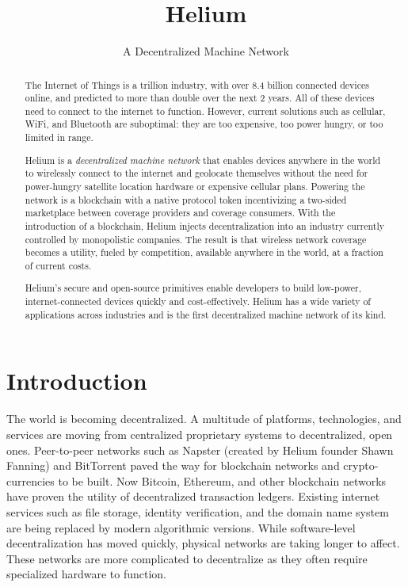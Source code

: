 \documentclass[10pt, nonatbib, nocopyrightspace, reprint]{sigplanconf}
\begin{document}
\setlength{\pdfpageheight}{\paperheight}
\setlength{\pdfpagewidth}{\paperwidth}

\title{Helium}
\subtitle{A Decentralized Machine Network}

\maketitle

\begin{abstract}
The Internet of Things is a  trillion industry, with over 8.4 billion connected devices online, and predicted to more than double over the next 2 years. All of these devices need to connect to the internet to function. However, current solutions such as cellular, WiFi, and Bluetooth are suboptimal: they are too expensive, too power hungry, or too limited in range.

Helium is a \emph{decentralized machine network} that enables devices anywhere in the world to wirelessly connect to the internet and geolocate themselves without the need for power-hungry satellite location hardware or expensive cellular plans. Powering the network is a blockchain with a native protocol token incentivizing a two-sided marketplace between coverage providers and coverage consumers. With the introduction of a blockchain, Helium injects decentralization into an industry currently controlled by monopolistic companies. The result is that wireless network coverage becomes a utility, fueled by competition, available anywhere in the world, at a fraction of current costs.

Helium's secure and open-source primitives enable developers to build low-power, internet-connected devices quickly and cost-effectively. Helium has a wide variety of applications across industries and is the first decentralized machine network of its kind.
\end{abstract}



\section{Introduction}

The world is becoming decentralized. A multitude of platforms, technologies, and services are moving from centralized proprietary systems to decentralized, open ones. Peer-to-peer networks such as Napster (created by Helium founder Shawn Fanning) \cite{napster} and BitTorrent paved the way for blockchain networks and crypto-currencies to be built. Now Bitcoin, Ethereum, and other blockchain networks have proven the utility of decentralized transaction ledgers. Existing internet services such as file storage, identity verification, and the domain name system are being replaced by modern algorithmic versions. While software-level decentralization has moved quickly, physical networks are taking longer to affect. These networks are more complicated to decentralize as they often require specialized hardware to function.
\end{document}
